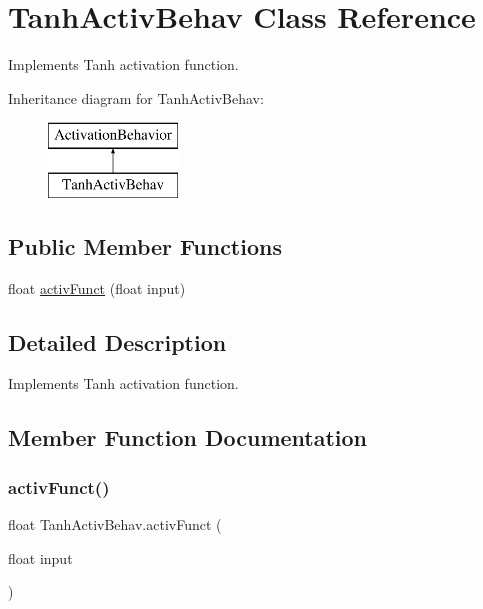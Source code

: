 \hypertarget{class_tanh_activ_behav}{}\section{Tanh\+Activ\+Behav Class Reference}
\label{class_tanh_activ_behav}


Implements Tanh activation function.  


Inheritance diagram for Tanh\+Activ\+Behav\+:\begin{figure}[H]
\begin{center}
\leavevmode
\includegraphics[height=2.000000cm]{class_tanh_activ_behav}
\end{center}
\end{figure}
\subsection*{Public Member Functions}
\begin{DoxyCompactItemize}
\item 
float \mbox{\hyperlink{class_tanh_activ_behav_a7aa47f0ab45debc7cc89d62334e28b77}{activ\+Funct}} (float input)
\end{DoxyCompactItemize}


\subsection{Detailed Description}
Implements Tanh activation function. 



\subsection{Member Function Documentation}
\mbox{\label{class_tanh_activ_behav_a7aa47f0ab45debc7cc89d62334e28b77}} 
\subsubsection{\texorpdfstring{activ\+Funct()}{activFunct()}}
{\footnotesize\ttfamily float Tanh\+Activ\+Behav.\+activ\+Funct (\begin{DoxyParamCaption}\item[{float}]{input }\end{DoxyParamCaption})}




